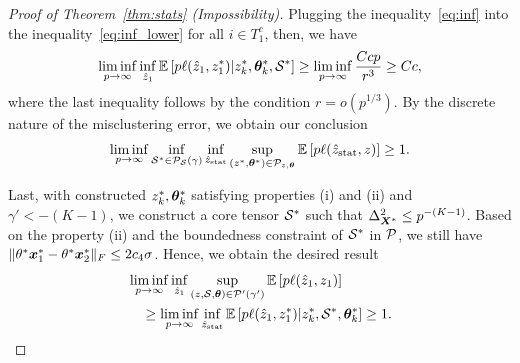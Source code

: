 \documentclass[journal]{IEEEtran}
\theoremstyle{definition}
\theoremstyle{definition}
\begin{document}
\begin{proof}[Proof of Theorem~\ref{thm:stats} (Impossibility)]
   Plugging the inequality~\eqref{eq:inf} into the inequality~\eqref{eq:inf_lower} for all $i \in T_1^c$, then, we have 
   \begin{equation}
       \liminf_{p \rightarrow \infty}  \inf_{\hat z_1 } \mathbb{E} \left[ p \ell(\hat z_1, z_1^*) | z^*_k, \boldsymbol{\theta}^*_k, \mathcal{S}^*  \right]  \geq \liminf_{p \rightarrow \infty} \frac{ C cp }{r^3} \geq C c,
   \end{equation}
   where the last inequality follows by the condition $r = o(p^{1/3})$. By the discrete nature of the misclustering error, we obtain our conclusion
   \begin{equation}
       \liminf_{p \rightarrow \infty} \inf_{\mathcal{S}^* \in  \mathcal{P}_{\mathcal{S}}(\gamma)}  \inf_{\hat z_{\text{stat}} }\sup_{ (z^*, \boldsymbol{\theta}^*) \in \mathcal{P}_{z, \boldsymbol{\theta}}} \mathbb{E} \left[ p\ell(\hat z_{\text{stat}}, z) \right]  \geq 1. 
   \end{equation}

{


Last, with constructed $z^*_k, \boldsymbol{\theta}^*_k$ satisfying properties (i) and (ii) and $\gamma' < -(K-1)$, we construct a core tensor $\mathcal{S}^*$ such that $\Delta_{\bm X^*}^2 \leq p^{-(K-1)}$. Based on the property (ii) and the boundedness constraint of $\mathcal{S}^*$ in $\mathcal{P}$, we still have $\lVert \theta^* \bm x_1^*  - \theta^* \bm x_2^*\rVert_F \leq 2c_4 \sigma$. Hence, we obtain the desired result 
\begin{align}
    &\liminf_{p \rightarrow \infty} \inf_{\hat z_1} \sup_{(z, \mathcal{S}, \boldsymbol{\theta}) \in \mathcal{P}'(\gamma')} \mathbb{E} \left[ p\ell(\hat z_1, z_1) \right]  \\
    &\quad \geq   \liminf_{p \rightarrow \infty} \inf_{\hat z_{\rm stat}}  \mathbb{E} \left[ p\ell(\hat z_1, z^*_1) |  z^*_k, \mathcal{S}^*, \boldsymbol{\theta}^*_k  \right]  \geq 1.
\end{align}



}

   \end{proof}
\end{document}

